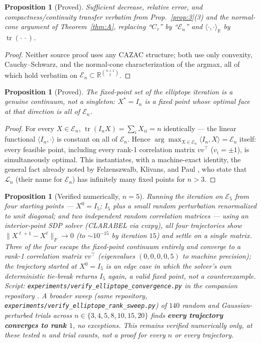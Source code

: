 \documentclass[11pt]{article}
\theoremstyle{plain}
\newtheorem{proposition}[theorem]{Proposition}
\theoremstyle{definition}
\theoremstyle{remark}
\newcommand{\R}{\mathbb R}
\newcommand{\El}{\mathcal E_n}
\begin{document}
\begin{proposition}[Proved]\label{prop:ell2}
Sufficient decrease, relative error, and compactness/continuity transfer
verbatim from Prop.~\ref{prop:3}(3) and the normal-cone argument of
Theorem~\ref{thm:A}, replacing ``$C_\tau$'' by ``$\El$'' and
$\langle\cdot,\cdot\rangle_\R$ by $\operatorname{tr}(\cdot\,\cdot)$.
\end{proposition}
\begin{proof}
Neither source proof uses any CAZAC structure; both use only convexity,
Cauchy--Schwarz, and the normal-cone characterization of the argmax, all of
which hold verbatim on $\El\subset\R^{\binom{n+1}2}$.
\end{proof}

\begin{proposition}[Proved]\label{prop:ell3}
The fixed-point set of the elliptope iteration is a genuine continuum, not
a singleton: $X^*=I_n$ is a fixed point whose optimal face at that
direction is all of $\El$.
\end{proposition}
\begin{proof}
For every $X\in\El$, $\operatorname{tr}(I_nX)=\sum_iX_{ii}=n$ identically ---
the linear functional $\langle I_n,\cdot\rangle$ is constant on all of
$\El$. Hence $\arg\max_{X\in\El}\langle I_n,X\rangle=\El$ itself: every
feasible point, including every rank-1 correlation matrix $vv^\top$
($v_i=\pm1$), is simultaneously optimal. This instantiates, with a
machine-exact identity, the general fact already noted by Felzenszwalb,
Klivans, and Paul \cite{FKP21}, who state that $\mathcal L_n$ (their name
for $\El$) has infinitely many fixed points for $n>3$.
\end{proof}

\begin{proposition}[Verified numerically, $n=5$]\label{prop:ell4}
Running the iteration on $\mathcal E_5$ from four starting points ---
$X^0=I_5$; $I_5$ plus a small random perturbation renormalized to unit
diagonal; and two independent random correlation matrices --- using an
interior-point SDP solver (CLARABEL via cvxpy), all four trajectories show
$\|X^{\ell+1}-X^\ell\|_F\to0$ (to $\sim10^{-15}$ by iteration $15$) and
settle on a single matrix. Three of the four escape the fixed-point
continuum entirely and converge to a rank-1 correlation matrix $vv^\top$
(eigenvalues $(0,0,0,0,5)$ to machine precision); the trajectory started at
$X^0=I_5$ is an edge case in which the solver's own deterministic tie-break
returns $I_5$ again, a valid fixed point, not a counterexample. Script:
{\tt experiments/verify\_elliptope\_convergence.py} in the companion
repository \cite{CazacAlgorithmRepo}. A broader sweep (same repository,
{\tt experiments/verify\_elliptope\_rank\_sweep.py}) of $140$ random and
Gaussian-perturbed trials across $n\in\{3,4,5,8,10,15,20\}$ finds
\textbf{every trajectory converges to rank $1$}, no exceptions. This
remains \emph{verified numerically only}, at these tested $n$ and trial
counts, not a proof for every $n$ or every trajectory.
\end{proposition}
\end{document}
